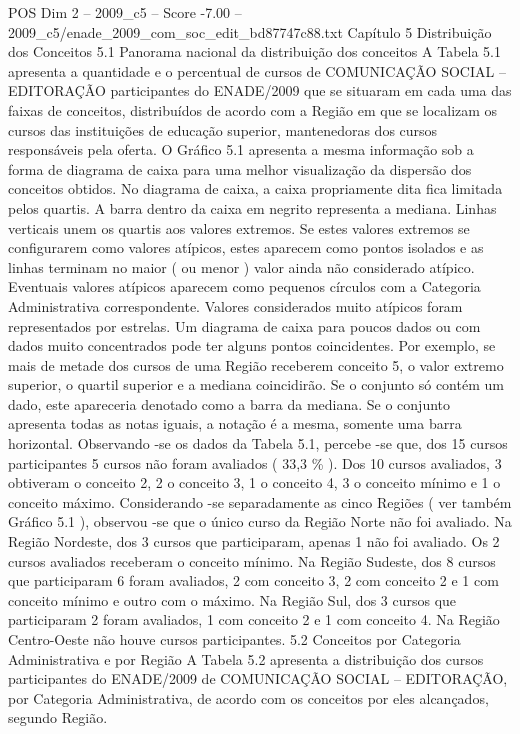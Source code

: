 \begin{textsample}{POS Dim 2 – 2009\_c5 – Score -7.00 – 2009\_c5/enade\_2009\_com\_soc\_edit\_bd87747c88.txt}  \label{ex:f2_pos_419}
Capítulo 5 Distribuição dos Conceitos 5.1 Panorama nacional da distribuição dos conceitos A Tabela 5.1 apresenta a quantidade e o percentual de cursos de COMUNICAÇÃO SOCIAL – EDITORAÇÃO participantes do ENADE/2009 que se situaram em cada uma das faixas de conceitos, distribuídos de acordo com a Região em que se localizam os cursos das instituições de educação superior, mantenedoras dos cursos responsáveis pela oferta.
O Gráfico 5.1 apresenta a mesma informação sob a forma de diagrama de caixa para uma melhor visualização da dispersão dos conceitos obtidos.
No diagrama de caixa, a caixa propriamente dita fica limitada pelos quartis.
A barra dentro da caixa em negrito representa a mediana.
Linhas verticais unem os quartis aos valores extremos.
Se estes valores extremos se configurarem como valores atípicos, estes aparecem como pontos isolados e as linhas terminam no maior ( ou menor ) valor ainda não considerado atípico.
Eventuais valores atípicos aparecem como pequenos círculos com a Categoria Administrativa correspondente.
Valores considerados muito atípicos foram representados por estrelas.
Um diagrama de caixa para poucos dados ou com dados muito concentrados pode ter alguns pontos coincidentes.
Por exemplo, se mais de metade dos cursos de uma Região receberem conceito 5, o valor extremo superior, o quartil superior e a mediana coincidirão.
Se o conjunto só contém um dado, este apareceria denotado como a barra da mediana.
Se o conjunto apresenta todas as notas iguais, a notação é a mesma, somente uma barra horizontal.
Observando -se os dados da Tabela 5.1, percebe -se que, dos 15 cursos participantes 5 cursos não foram avaliados ( 33,3 \% ).
Dos 10 cursos avaliados, 3 obtiveram o conceito 2, 2 o conceito 3, 1 o conceito 4, 3 o conceito mínimo e 1 o conceito máximo.
Considerando -se separadamente as cinco Regiões ( ver também Gráfico 5.1 ), observou -se que o único curso da Região Norte não foi avaliado.
Na Região Nordeste, dos 3 cursos que participaram, apenas 1 não foi avaliado.
Os 2 cursos avaliados receberam o conceito mínimo.
Na Região Sudeste, dos 8 cursos que participaram 6 foram avaliados, 2 com conceito 3, 2 com conceito 2 e 1 com conceito mínimo e outro com o máximo.
Na Região Sul, dos 3 cursos que participaram 2 foram avaliados, 1 com conceito 2 e 1 com conceito 4.
Na Região Centro-Oeste não houve cursos participantes. 5.2 Conceitos por Categoria Administrativa e por Região A Tabela 5.2 apresenta a distribuição dos cursos participantes do ENADE/2009 de COMUNICAÇÃO SOCIAL – EDITORAÇÃO, por Categoria Administrativa, de acordo com os conceitos por eles alcançados, segundo Região.

\end{textsample}
